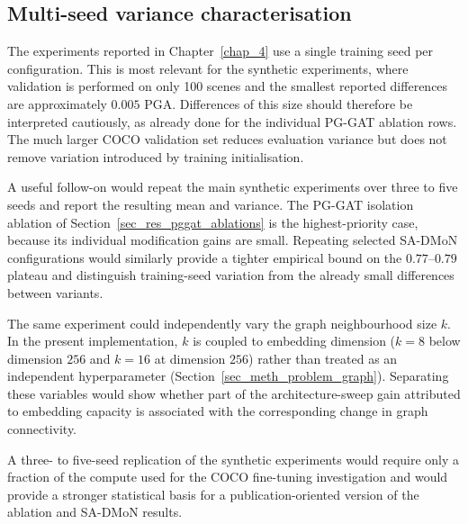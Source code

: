 \subsection{Multi-seed variance characterisation}
\label{sec_conc_future_seeds}

The experiments reported in Chapter~\ref{chap_4} use a single training
seed per configuration.
This is most relevant for the synthetic experiments,
where validation is performed on only 100 scenes and the smallest
reported differences are approximately $0.005$ PGA.
Differences of this size should therefore be interpreted cautiously,
as already done for the individual PG-GAT ablation rows.
The much larger COCO validation set reduces evaluation variance
but does not remove variation introduced by training initialisation.

A useful follow-on would repeat the main synthetic experiments over
three to five seeds and report the resulting mean and variance.
The PG-GAT isolation ablation of Section~\ref{sec_res_pggat_ablations}
is the highest-priority case,
because its individual modification gains are small.
Repeating selected SA-DMoN configurations would similarly provide a
tighter empirical bound on the $0.77$--$0.79$ plateau and distinguish
training-seed variation from the already small differences between
variants.

The same experiment could independently vary the graph neighbourhood
size $k$.
In the present implementation, $k$ is coupled to embedding dimension
($k=8$ below dimension $256$ and $k=16$ at dimension $256$) rather than
treated as an independent hyperparameter
(Section~\ref{sec_meth_problem_graph}).
Separating these variables would show whether part of the
architecture-sweep gain attributed to embedding capacity is associated
with the corresponding change in graph connectivity.

A three- to five-seed replication of the synthetic experiments would
require only a fraction of the compute used for the COCO fine-tuning
investigation and would provide a stronger statistical basis for a
publication-oriented version of the ablation and SA-DMoN results.